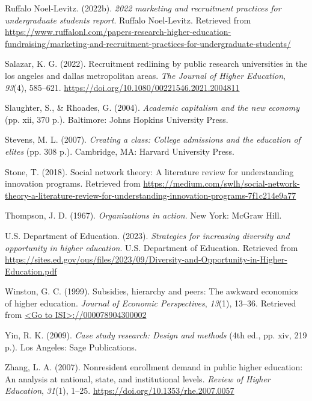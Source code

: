 \documentclass[
  12pt,
]{article}
\newlength{\cslhangindent}
\newlength{\cslentryspacingunit} %
\newenvironment{CSLReferences}[2] %
 {%
  \setlength{\parindent}{0pt}
  \ifodd #1
  \let\oldpar\par
  \def\par{\hangindent=\cslhangindent\oldpar}
  \fi
  \setlength{\parskip}{#2\cslentryspacingunit}
 }%
 {}
\begin{document}
\begin{CSLReferences}{1}{0}
\leavevmode{}%
Ruffalo Noel-Levitz. (2022b). \emph{2022 marketing and recruitment practices for undergraduate students report}. Ruffalo Noel-Levitz. Retrieved from \url{https://www.ruffalonl.com/papers-research-higher-education-fundraising/marketing-and-recruitment-practices-for-undergraduate-students/}

\leavevmode{}%
Salazar, K. G. (2022). Recruitment redlining by public research universities in the los angeles and dallas metropolitan areas. \emph{The Journal of Higher Education}, \emph{93}(4), 585--621. \url{https://doi.org/10.1080/00221546.2021.2004811}

\leavevmode{}%
Slaughter, S., \& Rhoades, G. (2004). \emph{Academic capitalism and the new economy} (pp. xii, 370 p.). Baltimore: Johns Hopkins University Press.

\leavevmode{}%
Stevens, M. L. (2007). \emph{Creating a class: College admissions and the education of elites} (pp. 308 p.). Cambridge, MA: Harvard University Press.

\leavevmode{}%
Stone, T. (2018). Social network theory: A literature review for understanding innovation programs. Retrieved from \url{https://medium.com/swlh/social-network-theory-a-literature-review-for-understanding-innovation-programs-7f1c214e9a77}

\leavevmode{}%
Thompson, J. D. (1967). \emph{Organizations in action}. New York: McGraw Hill.

\leavevmode{}%
U.S. Department of Education. (2023). \emph{Strategies for increasing diversity and opportunity in higher education}. U.S. Department of Education. Retrieved from \url{https://sites.ed.gov/ous/files/2023/09/Diversity-and-Opportunity-in-Higher-Education.pdf}

\leavevmode{}%
Winston, G. C. (1999). Subsidies, hierarchy and peers: The awkward economics of higher education. \emph{Journal of Economic Perspectives}, \emph{13}(1), 13--36. Retrieved from \href{\%3CGo\%20to\%20ISI\%3E://000078904300002}{\textless Go to ISI\textgreater://000078904300002}

\leavevmode{}%
Yin, R. K. (2009). \emph{Case study research: Design and methods} (4th ed., pp. xiv, 219 p.). Los Angeles: Sage Publications.

\leavevmode{}%
Zhang, L. A. (2007). Nonresident enrollment demand in public higher education: An analysis at national, state, and institutional levels. \emph{Review of Higher Education}, \emph{31}(1), 1--25. \url{https://doi.org/10.1353/rhe.2007.0057}

\end{CSLReferences}
\end{document}
